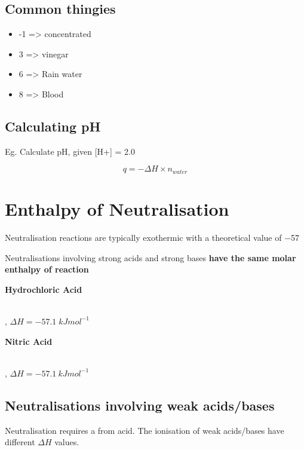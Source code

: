	\subsection{Common thingies}
		\begin{itemize}
			\item -1 => concentrated 
			\item 3 => vinegar
			\item 6 => Rain water
			\item 8 => Blood
		\end{itemize}
	
	\subsection{Calculating pH}
		Eg. Calculate pH, given [H+] = 2.0

$$q = - \Delta H \times n_{water}$$
\section{Enthalpy of Neutralisation} 
	Neutralisation reactions are typically exothermic with a theoretical value of \qty{-57}{\enthalpy}

	\begin{center}
	\end{center}

	Neutralisations involving strong acids and strong bases \textbf{have the same molar enthalpy of reaction}

	\textbf{Hydrochloric Acid}
	\begin{center}
		 \\
		, $\Delta H = -57.1 \; kJmol^{-1}$
	\end{center}

	\textbf{Nitric Acid}
	\begin{center}
		 \\
		, $\Delta H = -57.1 \: kJmol^{-1}$
	\end{center}

	\subsection{Neutralisations involving weak acids/bases}
		Neutralisation requires a  from acid. The ionisation of weak acids/bases have different $\Delta H$ values.

